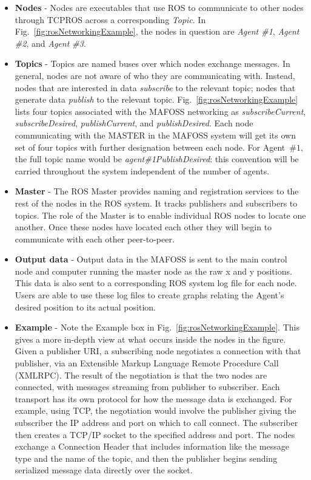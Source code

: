 \begin{itemize}
    \item \textbf{Nodes} - Nodes are executables that use ROS to communicate to other nodes through TCPROS across a corresponding \emph{Topic}. In Fig.~\ref{fig:rosNetworkingExample}, the nodes in question are \emph{Agent \#1}, \emph{Agent \#2}, and \emph{Agent \#3}.
    \item \textbf{Topics} - Topics are named buses over which nodes exchange messages. In general, nodes are not aware of who they are communicating with. Instead, nodes that are interested in data \emph{subscribe} to the relevant topic; nodes that generate data \emph{publish} to the relevant topic. Fig.~\ref{fig:rosNetworkingExample} lists four topics associated with the MAFOSS networking as \emph{subscribeCurrent}, \emph{subscribeDesired}, \emph{publishCurrent}, and \emph{publishDesired}. Each node communicating with the MASTER in the MAFOSS system will get its own set of four topics with further designation between each node. For Agent~$\#1,$ the full topic name would be \emph{agent\#1PublishDesired}: this convention will be carried throughout the system independent of the number of agents. %
    \item \textbf{Master} - The ROS Master provides naming and registration services to the rest of the nodes in the ROS system. It tracks publishers and subscribers to topics. The role of the Master is to enable individual ROS nodes to locate one another. Once these nodes have located each other they will begin to communicate with each other peer-to-peer. 
    \item \textbf{Output data} - Output data in the MAFOSS is sent to the main control node and computer running the master node as the raw x and y positions. This data is also sent to a corresponding ROS system log file for each node. Users are able to use these log files to create graphs relating the Agent's desired position to its actual position.
    \item \textbf{Example} - Note the Example box in Fig.~\ref{fig:rosNetworkingExample}. This gives a more in-depth view at what occurs inside the nodes in the figure. Given a publisher URI, a subscribing node negotiates a connection with that publisher, via an Extensible Markup Language Remote Procedure Call (XMLRPC). The result of the negotiation is that the two nodes are connected, with messages streaming from publisher to subscriber. Each transport has its own protocol for how the message data is exchanged. For example, using TCP, the negotiation would involve the publisher giving the subscriber the IP address and port on which to call connect. The subscriber then creates a TCP/IP socket to the specified address and port. The nodes exchange a Connection Header that includes information like the message type and the name of the topic, and then the publisher begins sending serialized message data directly over the socket.

\end{itemize}
